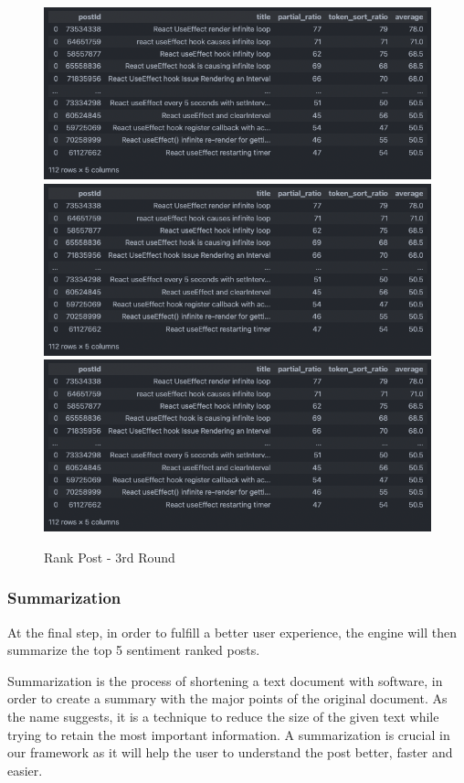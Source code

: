 \begin{figure}[H]
  \noindent \includegraphics[scale=0.55]{assets/fuzzy-wuzzy-query-1-results.png}
  \noindent \includegraphics[scale=0.55]{assets/fuzzy-wuzzy-query-1-results.png}
  \noindent \includegraphics[scale=0.55]{assets/fuzzy-wuzzy-query-1-results.png}
\caption{Rank Post - 3rd Round}\label{rank_post_3rd_round}
\end{figure}


\subsubsection{Summarization}
At the final step, in order to fulfill a better user experience, the engine will then summarize the top 5 sentiment ranked posts. 

Summarization is the process of shortening a text document with software, in order to create a summary with the major points of the original document. As the name suggests, it is a technique to reduce the size of the given text while trying to retain the most important information. A summarization is crucial in our framework as it will help the user to understand the post better, faster and easier.
 
